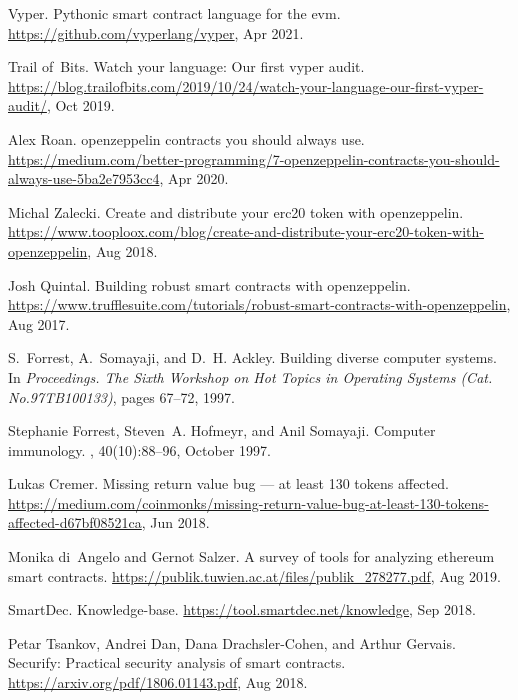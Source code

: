 \begin{thebibliography}{10}
Vyper.
\newblock Pythonic smart contract language for the evm.
\newblock \url{https://github.com/vyperlang/vyper}, Apr 2021.

Trail of~Bits.
\newblock Watch your language: Our first vyper audit.
\newblock
  \url{https://blog.trailofbits.com/2019/10/24/watch-your-language-our-first-vyper-audit/},
  Oct 2019.

Alex Roan.
 openzeppelin contracts you should always use.
\newblock
  \url{https://medium.com/better-programming/7-openzeppelin-contracts-you-should-always-use-5ba2e7953cc4},
  Apr 2020.

Michal Zalecki.
\newblock Create and distribute your erc20 token with openzeppelin.
\newblock
  \url{https://www.tooploox.com/blog/create-and-distribute-your-erc20-token-with-openzeppelin},
  Aug 2018.

Josh Quintal.
\newblock Building robust smart contracts with openzeppelin.
\newblock
  \url{https://www.trufflesuite.com/tutorials/robust-smart-contracts-with-openzeppelin},
  Aug 2017.

S.~{Forrest}, A.~{Somayaji}, and D.~H. {Ackley}.
\newblock Building diverse computer systems.
\newblock In {\em Proceedings. The Sixth Workshop on Hot Topics in Operating
  Systems (Cat. No.97TB100133)}, pages 67--72, 1997.

Stephanie Forrest, Steven~A. Hofmeyr, and Anil Somayaji.
\newblock Computer immunology.
, 40(10):88--96, October 1997.

Lukas Cremer.
\newblock Missing return value bug --- at least 130 tokens affected.
\newblock
  \url{https://medium.com/coinmonks/missing-return-value-bug-at-least-130-tokens-affected-d67bf08521ca},
  Jun 2018.

Monika di~Angelo and Gernot Salzer.
\newblock A survey of tools for analyzing ethereum smart contracts.
\newblock \url{https://publik.tuwien.ac.at/files/publik_278277.pdf}, Aug 2019.

SmartDec.
\newblock Knowledge-base.
\newblock \url{https://tool.smartdec.net/knowledge}, Sep 2018.

Petar Tsankov, Andrei Dan, Dana Drachsler-Cohen, and Arthur Gervais.
\newblock Securify: Practical security analysis of smart contracts.
\newblock \url{https://arxiv.org/pdf/1806.01143.pdf}, Aug 2018.


\end{thebibliography}
